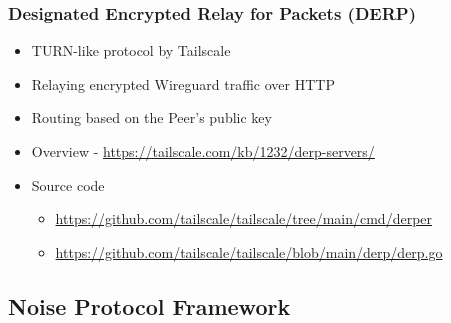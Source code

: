 \hypertarget{designated-encrypted-relay-for-packets-derp}{%
\subsubsection{Designated Encrypted Relay for Packets
(DERP)}\label{designated-encrypted-relay-for-packets-derp}}

\begin{itemize}
\tightlist
\item
  TURN-like protocol by Tailscale
\item
  Relaying encrypted Wireguard traffic over HTTP
\item
  Routing based on the Peer's public key
\item
  Overview - \url{https://tailscale.com/kb/1232/derp-servers/}
\item
  Source code

  \begin{itemize}
  \tightlist
  \item
    \url{https://github.com/tailscale/tailscale/tree/main/cmd/derper}
  \item
    \url{https://github.com/tailscale/tailscale/blob/main/derp/derp.go}
  \end{itemize}
\end{itemize}

\hypertarget{noise-protocol-framework}{%
\subsection{Noise Protocol Framework}\label{noise-protocol-framework}}

